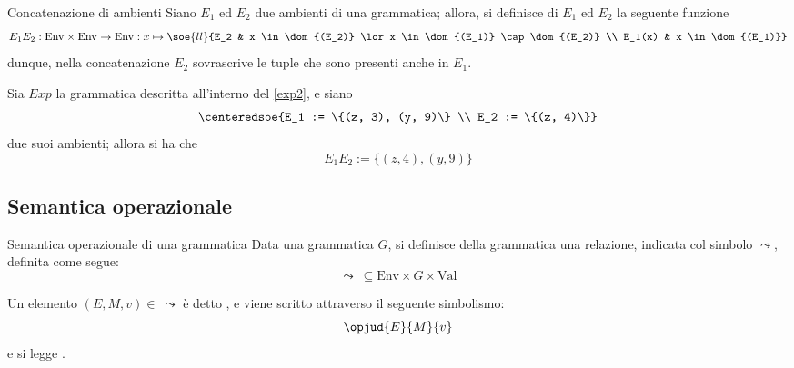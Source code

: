 \documentclass[a4paper, 12pt]{report}
\begin{document}
    \begin{frameddefn}{Concatenazione di ambienti}
        Siano $E_1$ ed $E_2$ due ambienti di una grammatica; allora, si definisce  di $E_1$ ed $E_2$ la seguente funzione $$E_1E_2: \mathrm{Env} \times \mathrm{Env} \to \mathrm{Env} : x \mapsto \soe{ll}{E_2 & x \in \dom{(E_2)} \lor x \in \dom{(E_1)} \cap \dom{(E_2)} \\ E_1(x) & x \in \dom{(E_1)}}$$ dunque, nella concatenazione $E_2$ sovrascrive le tuple che sono presenti anche in $E_1$.
    \end{frameddefn}

    \begin{example}
        Sia $Exp$ la grammatica descritta all'interno del \cref{exp2}, e siano $$\centeredsoe{E_1 := \{(z, 3), (y, 9)\} \\ E_2 := \{(z, 4)\}}$$ due suoi ambienti; allora si ha che $$E_1E_2 := \{(z, 4), (y, 9)\}$$
    \end{example}

    \subsection{Semantica operazionale}

    \begin{frameddefn}[label={sem opexp}]{Semantica operazionale di una grammatica}
        Data una grammatica $G$, si definisce  della grammatica una relazione, indicata col simbolo $\leadsto$, definita come segue: $$\leadsto \ \subseteq \mathrm{Env} \times G \times \mathrm{Val}$$

        Un elemento $(E, M, v) \in \ \leadsto$ è detto , e viene scritto attraverso il seguente simbolismo: $$\opjud{E}{M}{v}$$ e si legge .
    \end{frameddefn}
\end{document}
